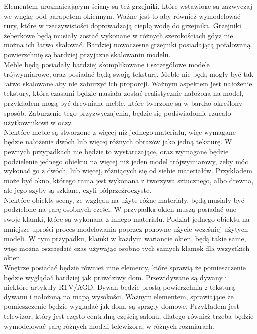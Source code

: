 \documentclass{article} %
\begin{document}
            Elementem urozmaicającym ściany są też grzejniki, które wstawione są zazwyczaj we wnękę pod parapetem okiennym. Ważne jest to aby również wymodelować rury, które w rzeczywistości doprowadzają ciepłą wodę do grzejnika. Grzejniki żeberkowe będą musiały zostać wykonane w różnych szerokościach gdyż nie można ich łatwo skalować. Bardziej nowoczesne grzejniki posiadającą pofalowaną powierzchnię są bardziej przyjazne skalowaniu modelu.
            \\
            
            Meble będą posiadały bardziej skomplikowane i szczegółowe modele trójwymiarowe, oraz posiadać będą swoją teksturę. Meble nie będą mogły być tak łatwo skalowane aby nie zaburzyć ich proporcji. Ważnym aspektem jest nałożenie tekstury, która czasami będzie musiała zostać realistycznie nałożona na model, przykładem mogą być drewniane meble, które tworzone są w bardzo określony sposób. Zaburzenie tego przyzwyczajenia, będzie się podświadomie rzucało użytkownikowi w oczy.
            \\
            
            Niektóre meble są stworzone z więcej niż jednego materiału, więc wymagane będzie nałożenie dwóch lub więcej różnych obrazów jako jedną teksturę. W pewnych przypadkach nie będzie to wystarczające, oraz wymagane będzie podzielenie jednego obiektu na więcej niż jeden model trójwymiarowy, żeby móc wykonać go z dwóch, lub więcej, różniących się od siebie materiałów. Przykładem może być okno, którego rama jest wykonana z tworzywa sztucznego, albo drewna, ale jego szyby są szklane, czyli półprzeźroczyste.
            \\
            
            Niektóre obiekty sceny, ze względu na użyte różne materiały, będą musiały być podzielone na parę osobnych części. W przypadku okien muszą posiadać one swoje klamki, które są wykonane z innego materiału. Podział jednego obiektu na mniejsze uprości proces modelowania poprzez ponowne użycie wcześniej użytych modeli. W tym przypadku, klamki w każdym wariancie okien, będą takie same, więc można oszczędzić czas używając osobno tych samych klamek dla wszystkich okien.
            \\
            
            Wnętrze posiadać będzie również inne elementy, które sprawią że pomieszczenie będzie wyglądać bardziej jak prawdziwy dom. Przewidywane są dywany i niektóre artykuły RTV/AGD. Dywan będzie prostą powierzchnią z teksturą dywanu i nałożoną na mapą wysokości. Ważnym elementem, sprawiające że pomieszczenie będzie wyglądać jak dom, są sprzęty domowe. Przykładem jest telewizor, który jest często centralną częścią salonu, dlatego również trzeba będzie wymodelować parę różnych modeli telewizora, w różnych rozmiarach. 
            \\
            
\end{document}
